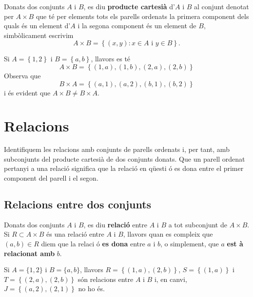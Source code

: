 \bigskip

Donats dos conjunts $A$ i $B$, es diu \textbf{producte cartesi\`{a}} d'$A$ i
$B$ al conjunt denotat per $A\times B$ que t\'{e} per elements tots els
parells ordenats la primera component dels quals \'{e}s un element d'$A$ i
la segona component \'{e}s un element de $B$, simb\`{o}licament escrivim
\begin{equation*}
A\times B=\left\{ (x,y):x\in A\text{ i }y\in B\right\} \text{.}
\end{equation*}

\begin{exemple}
Si $A=\left\{ 1,2\right\} $ i $B=\left\{ a,b\right\} $, llavors es t\'{e}%
\begin{equation*}
A\times B=\left\{ (1,a),(1,b),(2,a),(2,b)\right\}
\end{equation*}
Observa que%
\begin{equation*}
B\times A=\left\{ (a,1),(a,2),(b,1),(b,2)\right\}
\end{equation*}
i \'{e}s evident que $A\times B\neq B\times A$.
\end{exemple}

\section{Relacions}

Identifiquem les relacions amb conjunts de parells ordenats i, per tant, amb
subconjunts del producte cartesi\`{a} de dos conjunts donats. Que un parell
ordenat pertanyi a una relaci\'{o} significa que la relaci\'{o} en q\"{u}esti%
\'{o} es dona entre el primer component del parell i el segon.

\subsection{Relacions entre dos conjunts}

Donats dos conjunts $A$ i $B$, es diu \textbf{relaci\'{o}} entre $A$ i $B$ a
tot subconjunt de $A\times B$. Si $R\subset A\times B$ \'{e}s una relaci\'{o}
entre $A$ i $B$, llavors quan es compleix que $(a,b)\in R$ diem que la relaci%
\'{o} \textbf{es dona} entre $a$ i $b$, o simplement, que $a$ \textbf{est%
\`{a} relacionat amb} $b$.

\begin{exemple}
Si $A=\{1,2\}$ i $B=\{a,b\}$, llavors $R=\left\{ (1,a),(2,b)\right\} $, $%
S=\left\{ (1,a)\right\} $ i $T=\left\{ (2,a),(2,b)\right\} $ s\'{o}n
relacions entre $A$ i $B$ i, en canvi, $J=\left\{ (a,2),(2,1)\right\} $ no
ho \'{e}s.
\end{exemple}

